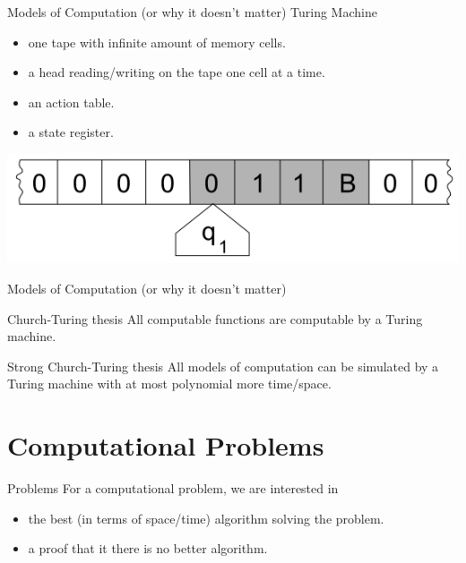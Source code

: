 \documentclass[c]{beamer}
\begin{document}
\begin{frame}{Models of Computation (or why it doesn't matter)}  
Turing Machine

 \begin{itemize}
			\item one tape with infinite amount of memory cells.
			\item a head reading/writing on the tape one cell at a time.
			\item an action table.
			\item a state register.
 \end{itemize}
 
\begin{center}
 \includegraphics[scale=0.3]{images/tm.png} 
\end{center}
\end{frame}	

\begin{frame}{Models of Computation (or why it doesn't matter)}  
	\begin{block}{ Church-Turing thesis }
		All computable functions are computable by a Turing machine.
    \end{block}
    \begin{block}{ Strong Church-Turing thesis }
		All models of computation can be simulated by a Turing machine with at most polynomial more time/space.
    \end{block}
\end{frame}

\section{Computational Problems}
\begin{frame}{Problems}
         For a computational problem, we are interested in
         \begin{itemize}
			\item the best (in terms of space/time) algorithm solving the problem.
			\item a proof that it there is no better algorithm.
		\end{itemize}	  
	
\end{frame}
\end{document}
